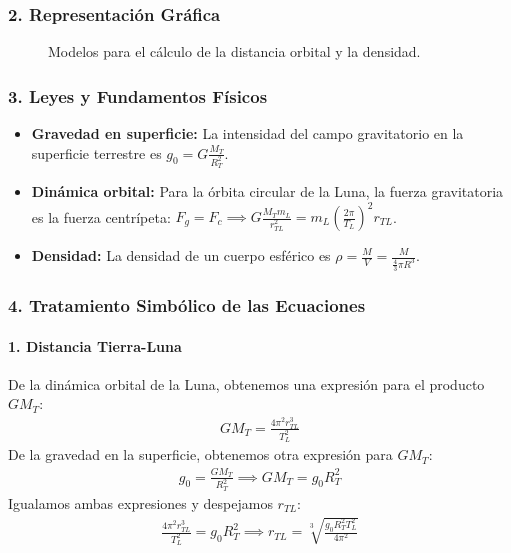 \subsubsection*{2. Representación Gráfica}
\begin{figure}[H]
    \centering
    \caption{Modelos para el cálculo de la distancia orbital y la densidad.}
\end{figure}

\subsubsection*{3. Leyes y Fundamentos Físicos}
\begin{itemize}
    \item \textbf{Gravedad en superficie:} La intensidad del campo gravitatorio en la superficie terrestre es $g_0 = G\frac{M_T}{R_T^2}$.
    \item \textbf{Dinámica orbital:} Para la órbita circular de la Luna, la fuerza gravitatoria es la fuerza centrípeta: $F_g = F_c \implies G\frac{M_T m_L}{r_{TL}^2} = m_L \left(\frac{2\pi}{T_L}\right)^2 r_{TL}$.
    \item \textbf{Densidad:} La densidad de un cuerpo esférico es $\rho = \frac{M}{V} = \frac{M}{\frac{4}{3}\pi R^3}$.
\end{itemize}

\subsubsection*{4. Tratamiento Simbólico de las Ecuaciones}
\paragraph{1. Distancia Tierra-Luna}
De la dinámica orbital de la Luna, obtenemos una expresión para el producto $GM_T$:
\begin{gather}
    G M_T = \frac{4\pi^2 r_{TL}^3}{T_L^2}
\end{gather}
De la gravedad en la superficie, obtenemos otra expresión para $GM_T$:
\begin{gather}
    g_0 = \frac{GM_T}{R_T^2} \implies GM_T = g_0 R_T^2
\end{gather}
Igualamos ambas expresiones y despejamos $r_{TL}$:
\begin{gather}
    \frac{4\pi^2 r_{TL}^3}{T_L^2} = g_0 R_T^2 \implies r_{TL} = \sqrt[3]{\frac{g_0 R_T^2 T_L^2}{4\pi^2}}
\end{gather}
